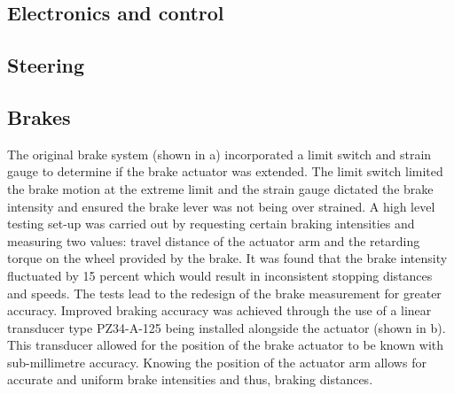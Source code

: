 \documentclass[main.tex]{subfiles}
\begin{document}
\subsection{Electronics and control}

\subsection{Steering}

\subsection{Brakes}
The original brake system (shown in  a) incorporated a limit switch and strain gauge to determine if the brake actuator was extended. The limit switch limited the brake motion at the extreme limit and the strain gauge dictated the brake intensity and ensured the brake lever was not being over strained. A high level testing set-up was carried out by requesting certain braking intensities and measuring two values: travel distance of the actuator arm and the retarding torque on the wheel provided by the brake. It was found that the brake intensity fluctuated by 15 percent which would result in inconsistent stopping distances and speeds. The tests lead to the redesign of the brake measurement for greater accuracy. Improved braking accuracy was achieved through the use of a linear transducer type PZ34-A-125 being installed alongside the actuator (shown in  b). This transducer allowed for the position of the brake actuator to be known with sub-millimetre accuracy. Knowing the position of the actuator arm allows for accurate and uniform brake intensities and thus, braking distances.
\end{document}
